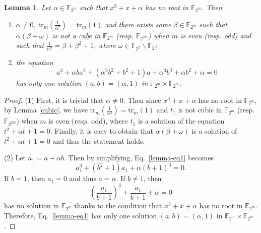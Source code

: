 \documentclass{article}
\newtheorem{lemma}{Lemma}
\newcommand{\mkq}[1]{{{\color{black}#1}}}
\def\f2{{\mathbb F}_{2}}
\def\fm{{\mathbb F}_{2^m}}
\newcommand{\tr}{\mathrm{tr}}
\begin{document}
\mkq{\begin{lemma}
		\label{lemma1}
	Let $\alpha\in \fm$ such that  $ x^{3}+x+\alpha$ has no root in $\mathbb{F}_{2^m}$. Then 
	\begin{enumerate}[(1)]
		\item 	$\alpha\neq0$,  $\tr_m\left( \frac{1}{\alpha^2} \right) = \tr_m(1)$ and there exists some $\beta\in\fm$ such that $\alpha(\beta + \omega)$ is not a cube in  $\fm$ (resp. $\mathbb{F}_{2^{2m}}$) when $m$ is even (resp. odd) and such that $\frac{1}{\alpha^2} = \beta + \beta^2+1$, where $\omega\in\mathbb{F}_{2^2}\backslash\f2$;
		\item  the equation
		\begin{equation}
			\label{lemma-eq1} a^3+\alpha b a^2 + (\alpha^2 b^2 + b^2 +1) a + \alpha^3b^3+\alpha b^2 + \alpha =0
		\end{equation}  has only one solution $(a,b)=(\alpha,1)$ in $\fm\times \fm$. 
	\end{enumerate}
\end{lemma}
\begin{proof}
(1) First, it is trivial that $\alpha\neq 0$. Then since  $ x^{3}+x+\alpha$ has no root in $\mathbb{F}_{2^m}$,    by Lemma \ref{cubic}, we have  $\tr_m\left( \frac{1}{\alpha^2} \right) = \tr_m(1)$ and $t_1$ is not cubic in $\fm$ (resp. $\mathbb{F}_{2^{2m}}$) when $m$ is even (resp. odd), where $t_1$ is a solution of the equation $t^2+\alpha t+1 = 0$. Finally, it is easy to obtain that $\alpha(\beta + \omega)$ is a solution of $t^2+\alpha t+1 = 0$ and thus the statement holds.

(2) Let $a_1=a+\alpha b$. Then by simplifying, Eq.\ \eqref{lemma-eq1} becomes 
	$$a_1^3+ (b^2+1)a_1 + \alpha (b+1)^3 = 0.$$
	If $b=1$, then $a_1=0$ and thus $a=\alpha$. If $b\neq 1$, then $$\left(\frac{a_1}{b+1}\right)^3 + \frac{a_1}{b+1} + \alpha =0 $$
	has no solution in $\fm$ thanks to the condition that $ x^{3}+x+\alpha$ has no root in $\mathbb{F}_{2^m}$. Therefore, Eq.\ \eqref{lemma-eq1} has only one solution $(a,b)=(\alpha,1)$ in $\fm\times \fm$. 
\end{proof}
}
\end{document}
